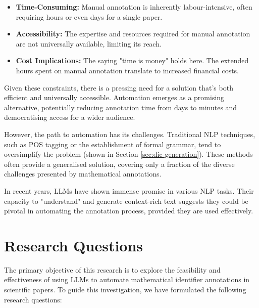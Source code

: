 \begin{itemize}
    \item \textbf{Time-Consuming:} Manual annotation is inherently labour-intensive, often requiring hours or even days for a single paper.
    
    \item \textbf{Accessibility:} The expertise and resources required for manual annotation are not universally available, limiting its reach.
    
    \item \textbf{Cost Implications:} The saying "time is money" holds here. The extended hours spent on manual annotation translate to increased financial costs.
\end{itemize}

Given these constraints, there is a pressing need for a solution that's both efficient and universally accessible. Automation emerges as a promising alternative, potentially reducing annotation time from days to minutes and democratising access for a wider audience.

However, the path to automation has its challenges. Traditional \ac{NLP} techniques, such as \ac{POS} tagging or the establishment of formal grammar, tend to oversimplify the problem (shown in Section \ref{sec:dic-generation}). These methods often provide a generalised solution, covering only a fraction of the diverse challenges presented by mathematical annotations. 

In recent years, LLMs have shown immense promise in various NLP tasks. Their capacity to "understand" and generate context-rich text suggests they could be pivotal in automating the annotation process, provided they are used effectively.

\section{Research Questions}

The primary objective of this research is to explore the feasibility and effectiveness of using LLMs to automate mathematical identifier annotations in scientific papers. To guide this investigation, we have formulated the following research questions:

